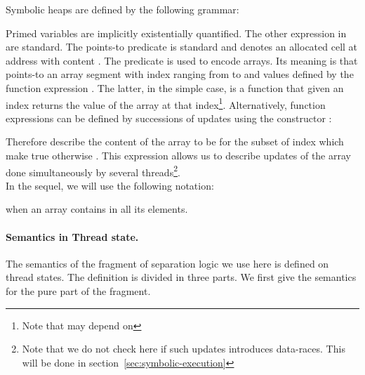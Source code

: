 \documentclass[a4paper,11pt]{llncs}
\newcounter{note_number}
\begin{document}
\noindent
Symbolic heaps are defined by the following grammar:

Primed variables are implicitly existentially quantified.
The other expression in  are standard.
The points-to predicate  is  standard and denotes an allocated cell at address  with content .
The predicate  is used to encode arrays. Its  meaning is  that  points-to an array segment with index ranging from  to  and values defined by the function expression . 
The latter, in the simple case, is a function  that given an index  returns the value of the array at that index\footnote{Note that  may depend on }.
Alternatively, function expressions  can be defined by successions of updates using the constructor :

Therefore  describe the content of the array to be  for the subset of index which make  true otherwise .
This expression allows us to describe updates of the array done simultaneously by several threads\footnote{Note that we do not check here if such updates introduces data-races. This will be done in section~\ref{sec:symbolic-execution}}.\\

\noindent
In the sequel, we will use the following notation:


when an array contains  in all its elements.

\paragraph{Semantics in Thread state. }
The semantics of the fragment of separation logic we use here is defined on thread states. The definition is divided in three parts. We first give the semantics  for the pure part of the fragment. 
\end{document}
